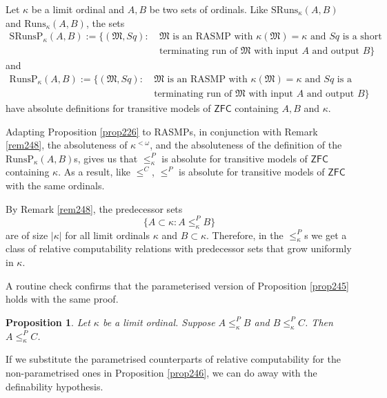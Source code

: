 \documentclass[12pt, twoside]{memoir}
\numberwithin{equation}{section}
\newtheorem{prop}[thm]{Proposition}
\theoremstyle{definition}
\theoremstyle{remark}
\theoremstyle{definition}
\theoremstyle{definition}
\theoremstyle{definition}
\theoremstyle{remark}
\begin{document}
Let $\kappa$ be a limit ordinal and $A, B$ be two sets of ordinals. Like $\mathrm{SRuns}_{\kappa}(A, B)$ and $\mathrm{Runs}_{\kappa}(A, B)$, the sets
\begin{align*}
    \mathrm{SRunsP}_{\kappa}(A, B) := \{(\mathfrak{M}, Sq) : \ & \mathfrak{M} \text{ is an RASMP with } \kappa(\mathfrak{M}) = \kappa \text{ and } Sq \text{ is a short} \\
    & \text{terminating run of } \mathfrak{M} \text{ with input } A \text{ and output } B\}
\end{align*}
and
\begin{align*}
    \mathrm{RunsP}_{\kappa}(A, B) := \{(\mathfrak{M}, Sq) : \ & \mathfrak{M} \text{ is an RASMP with } \kappa(\mathfrak{M}) = \kappa \text{ and } Sq \text{ is a} \\
    & \text{terminating run of } \mathfrak{M} \text{ with input } A \text{ and output } B\}
\end{align*}
have absolute definitions for transitive models of $\mathsf{ZFC}$ containing $A, B$ and $\kappa$. 

Adapting Proposition \ref{prop226} to RASMPs, in conjunction with Remark \ref{rem248}, the absoluteness of $\kappa^{< \omega}$, and the absoluteness of the definition of the $\mathrm{RunsP}_{\kappa}(A, B)$s, gives us that $\leq^P_{\kappa}$ is absolute for transitive models of $\mathsf{ZFC}$ containing $\kappa$. As a result, like $\leq^C$, $\leq^P$ is absolute for transitive models of $\mathsf{ZFC}$ with the same ordinals. 

By Remark \ref{rem248}, the predecessor sets
\begin{equation*}
    \{A \subset \kappa : A \leq^P_{\kappa} B\}
\end{equation*}
are of size $|\kappa|$ for all limit ordinals $\kappa$ and $B \subset \kappa$. Therefore, in the $\leq^P_{\kappa}$s we get a class of relative computability relations with predecessor sets that grow uniformly in $\kappa$.

A routine check confirms that the parameterised version of Proposition \ref{prop245} holds with the same proof.

\begin{prop}\label{prop251}
Let $\kappa$ be a limit ordinal. Suppose $A \leq^P_{\kappa} B$ and $B \leq^P_{\kappa} C$. Then $A \leq^P_{\kappa} C$.
\end{prop}

If we substitute the parametrised counterparts of relative computability for the non-parametrised ones in Proposition \ref{prop246}, we can do away with the definability hypothesis.
\end{document}
